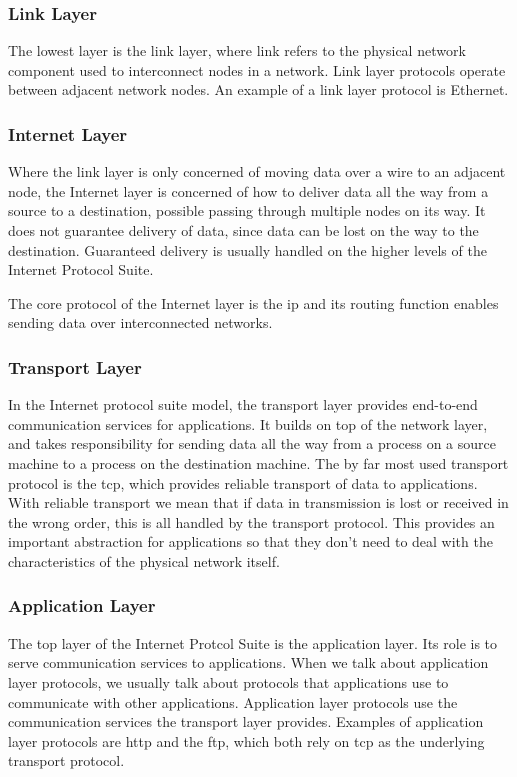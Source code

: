 \subsubsection{Link Layer}

The lowest layer is the link layer, where link refers to the physical
network component used to interconnect nodes in a network. Link layer protocols
operate between adjacent network nodes. An example of a link layer protocol is
Ethernet.

\subsubsection{Internet Layer}

 Where the link layer is only concerned of moving data over a wire to an
 adjacent node, the Internet layer is concerned of how to deliver data all the
 way from a source to a destination, possible passing through multiple nodes on
 its way. It does not guarantee delivery of data, since data can be lost on the
 way to the destination. Guaranteed delivery is usually handled on the higher
 levels of the Internet Protocol Suite.

 The core protocol of the Internet layer is the \gls{ip} and its routing function
 enables sending data over interconnected networks.

\subsubsection{Transport Layer}

In the Internet protocol suite model, the transport layer provides end-to-end
communication services for applications. It builds on top of the network layer,
and takes responsibility for sending data all the way from a process on a source
machine to a process on the destination machine. The by far most used transport
protocol is the \gls{tcp}, which provides reliable transport of data to
applications. With reliable transport we mean that if data in transmission is
lost or received in the wrong order, this is all handled by the transport
protocol. This provides an important abstraction for applications so that they
don't need to deal with the characteristics of the physical network itself.

\subsubsection{Application Layer}

The top layer of the Internet Protcol Suite is the application layer. Its role
is to serve communication services to applications. When we talk about
application layer protocols, we usually talk about protocols that applications
use to communicate with other applications. Application layer protocols use the
communication services the transport layer provides. Examples of application
layer protocols are \gls{http} and the \gls{ftp}, which both rely on \gls{tcp}
as the underlying transport protocol.

